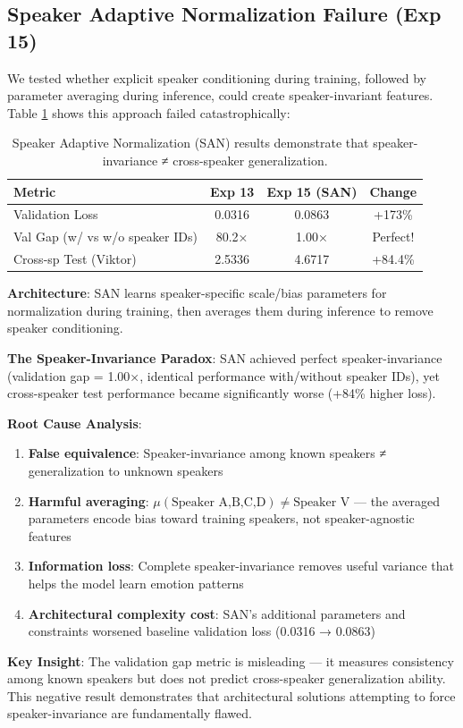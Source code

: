 \subsection{Speaker Adaptive Normalization Failure (Exp 15)}

We tested whether explicit speaker conditioning during training, followed by parameter averaging during inference, could create speaker-invariant features. Table \ref{tab:san_failure} shows this approach failed catastrophically:

\begin{table}[h]
\centering
\caption{Speaker Adaptive Normalization (SAN) results demonstrate that speaker-invariance ≠ cross-speaker generalization.}
\label{tab:san_failure}
\begin{tabular}{lccc}
\toprule
\textbf{Metric} & \textbf{Exp 13} & \textbf{Exp 15 (SAN)} & \textbf{Change} \\
\midrule
Validation Loss & 0.0316 & 0.0863 & +173\% \\
Val Gap (w/ vs w/o speaker IDs) & 80.2× & 1.00× & Perfect! \\
Cross-sp Test (Viktor) & 2.5336 & 4.6717 & +84.4\% \\
\bottomrule
\end{tabular}
\end{table}

\textbf{Architecture}: SAN learns speaker-specific scale/bias parameters for normalization during training, then averages them during inference to remove speaker conditioning.

\textbf{The Speaker-Invariance Paradox}: SAN achieved perfect speaker-invariance (validation gap = 1.00×, identical performance with/without speaker IDs), yet cross-speaker test performance became significantly worse (+84\% higher loss).

\textbf{Root Cause Analysis}:
\begin{enumerate}
    \item \textbf{False equivalence}: Speaker-invariance among known speakers ≠ generalization to unknown speakers
    \item \textbf{Harmful averaging}: $\mu(\text{Speaker A,B,C,D}) \neq \text{Speaker V}$ --- the averaged parameters encode bias toward training speakers, not speaker-agnostic features
    \item \textbf{Information loss}: Complete speaker-invariance removes useful variance that helps the model learn emotion patterns
    \item \textbf{Architectural complexity cost}: SAN's additional parameters and constraints worsened baseline validation loss (0.0316 → 0.0863)
\end{enumerate}

\textbf{Key Insight}: The validation gap metric is misleading --- it measures consistency among known speakers but does not predict cross-speaker generalization ability. This negative result demonstrates that architectural solutions attempting to force speaker-invariance are fundamentally flawed.
